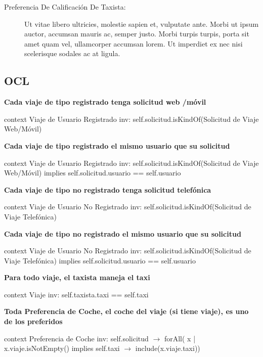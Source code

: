 \documentclass[a4paper, 10pt, twoside]{article}
\newenvironment{ocl}[1]
  {
    \textbf{#1}
    \verbatim
  }{
    \endverbatim
  }
\begin{document}
\begin{description}
  \item[Preferencia De Calificación De Taxista:] Ut vitae libero ultricies, molestie sapien et,   vulputate ante. Morbi ut ipsum auctor, accumsan mauris ac, semper justo. Morbi turpis turpis, porta sit amet quam vel, ullamcorper accumsan lorem. Ut imperdiet ex nec nisi scelerisque sodales ac at ligula.

\end{description}


\subsection{OCL}
  
\begin{ocl}{Cada viaje de tipo registrado tenga solicitud web /móvil}
  context Viaje de Usuario Registrado
  inv: self.solicitud.isKindOf(Solicitud de Viaje Web/Móvil)
\end{ocl}

\begin{ocl}{Cada viaje de tipo registrado el mismo usuario que su solicitud}
  context Viaje de Usuario Registrado
  inv: self.solicitud.isKindOf(Solicitud de Viaje Web/Móvil) implies self.solicitud.usuario == self.usuario
\end{ocl}

\begin{ocl}{Cada viaje de tipo no registrado tenga solicitud telefónica}
  context Viaje de Usuario No Registrado
  inv: self.solicitud.isKindOf(Solicitud de Viaje Telefónica)
\end{ocl}

\begin{ocl}{Cada viaje de tipo no registrado el mismo usuario que su solicitud}
  context Viaje de Usuario No Registrado
  inv: self.solicitud.isKindOf(Solicitud de Viaje Telefónica) implies self.solicitud.usuario == self.usuario
\end{ocl}


\begin{ocl}{Para todo viaje, el taxista maneja el taxi}
  context Viaje
  inv: self.taxista.taxi == self.taxi
\end{ocl}

\begin{ocl}{Toda Preferencia de Coche, el coche del viaje (si tiene viaje), es uno de los preferidos}
  context Preferencia de Coche
  inv: self.solicitud $\rightarrow$ forAll( x | x.viaje.isNotEmpty() implies self.taxi $\rightarrow$ include(x.viaje.taxi))
\end{ocl}
\end{document}
